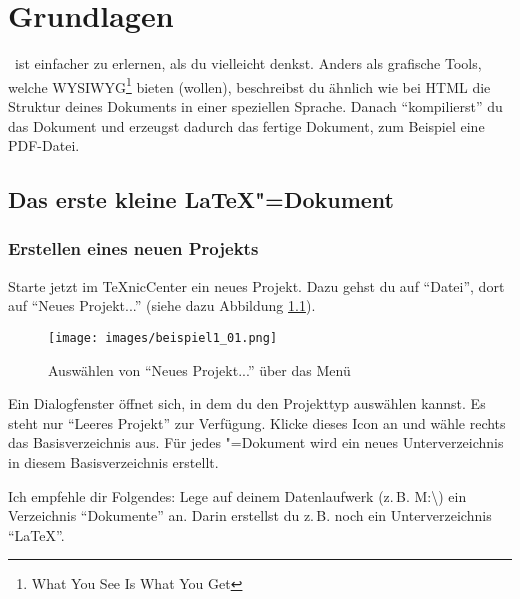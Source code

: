 %
%

\chapter{Grundlagen}
\label{sec:grundlagen}

\DMLLaTeX \ ist einfacher zu erlernen, als du vielleicht denkst. Anders als grafische Tools, welche WYSIWYG\footnote{What You See Is What You Get} bieten (wollen), beschreibst du ähnlich wie bei HTML die Struktur deines Dokuments in einer speziellen Sprache. Danach \enquote{kompilierst} du das Dokument und erzeugst dadurch das fertige Dokument, zum Beispiel eine PDF-Datei.


\section{Das erste kleine LaTeX"=Dokument}

\subsection{Erstellen eines neuen Projekts}
\label{sec:erstellenneuesprojekt}

Starte jetzt im TeXnicCenter ein neues Projekt. Dazu gehst du auf \enquote{Datei}, dort auf \enquote{Neues Projekt...} (siehe dazu Abbildung \ref{fig:beispiel1_01}).

\begin{figure}[ht]
	\begin{center}
		\texttt{[image: images/beispiel1\_01.png]}
	\end{center}
	\caption{Auswählen von \enquote{Neues Projekt...} über das Menü}
	\label{fig:beispiel1_01}
\end{figure}


Ein Dialogfenster öffnet sich, in dem du den Projekttyp auswählen kannst. Es steht nur \enquote{Leeres Projekt} zur Verfügung. Klicke dieses Icon an und wähle rechts das Basisverzeichnis aus. Für jedes \DMLLaTeX"=Dokument wird ein neues Unterverzeichnis in diesem Basisverzeichnis erstellt.

Ich empfehle dir Folgendes: Lege auf deinem Datenlaufwerk (z.\,B. M:\textbackslash ) ein Verzeichnis \enquote{Dokumente} an. Darin erstellst du z.\,B. noch ein Unterverzeichnis \enquote{LaTeX}.

